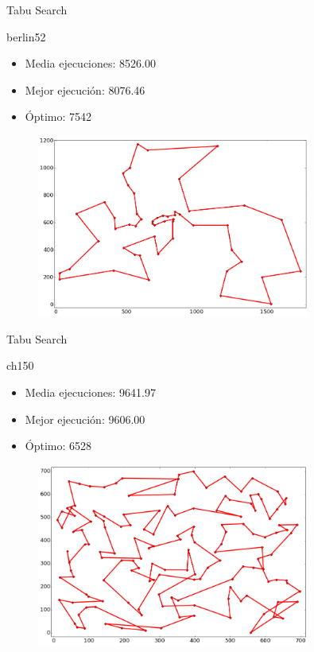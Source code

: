 \documentclass[ignorenonframetext,]{beamer}
\begin{document}
\begin{frame}{Tabu Search}

\begin{block}{berlin52}

\begin{itemize}
\item
  Media ejecuciones: 8526.00
\item
  Mejor ejecución: 8076.46
\item
  Óptimo: 7542
\end{itemize}

\begin{figure}[htbp]
\centering
\includegraphics[width=0.8\textwidth]{./images/berlin52ts.png}
\end{figure}

\end{block}

\end{frame}

\begin{frame}{Tabu Search}

\begin{block}{ch150}

\begin{itemize}
\item
  Media ejecuciones: 9641.97
\item
  Mejor ejecución: 9606.00
\item
  Óptimo: 6528
\end{itemize}

\begin{figure}[htbp]
\centering
\includegraphics[width=0.8\textwidth]{./images/ch150ts.png}
\end{figure}

\end{block}

\end{frame}
\end{document}
